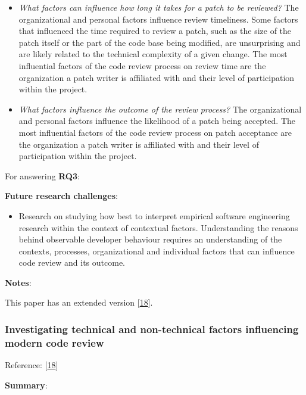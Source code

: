 \documentclass[]{book}
\providecommand{\tightlist}{%
  \setlength{\itemsep}{0pt}\setlength{\parskip}{0pt}}
\begin{document}
\begin{itemize}
\item
  \emph{What factors can influence how long it takes for a patch to be
  reviewed?} The organizational and personal factors influence review
  timeliness. Some factors that influenced the time required to review a
  patch, such as the size of the patch itself or the part of the code
  base being modified, are unsurprising and are likely related to the
  technical complexity of a given change. The most influential factors
  of the code review process on review time are the organization a patch
  writer is affiliated with and their level of participation within the
  project.
\item
  \emph{What factors influence the outcome of the review process?} The
  organizational and personal factors influence the likelihood of a
  patch being accepted. The most influential factors of the code review
  process on patch acceptance are the organization a patch writer is
  affiliated with and their level of participation within the project.
\end{itemize}

For answering \textbf{RQ3}:

\textbf{Future research challenges}:

\begin{itemize}
\tightlist
\item
  Research on studying how best to interpret empirical software
  engineering research within the context of contextual factors.
  Understanding the reasons behind observable developer behaviour
  requires an understanding of the contexts, processes, organizational
  and individual factors that can influence code review and its outcome.
\end{itemize}

\textbf{Notes}:

This paper has an extended version
{[}\protect\hyperlink{ref-baysal2016investigating}{18}{]}.

\subsubsection{Investigating technical and non-technical factors
influencing modern code
review}\label{investigating-technical-and-non-technical-factors-influencing-modern-code-review}

Reference: {[}\protect\hyperlink{ref-baysal2016investigating}{18}{]}

\textbf{Summary}:
\end{document}
